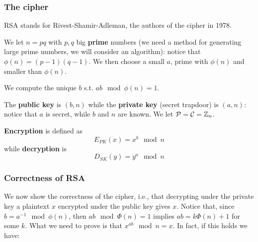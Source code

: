 
\subsubsection{The cipher}
RSA stands for Rivest-Shamir-Adleman, the authors of the cipher in 1978. 

We let $n = pq$ with $p,q$ big \textbf{prime} numbers (we need a method for generating large prime numbers, we will consider an algorithm): notice that $\phi(n) = (p-1)(q-1)$. We then choose a small $a$, prime with $\phi(n)$ and smaller than $\phi(n)$. 


We compute the unique $b$ s.t. $ab \mod \phi(n) = 1$.


The \textbf{public key} is $(b,n)$ while the \textbf{private key} (secret trapdoor) is $(a,n)$: notice that $a$ is secret, while $b$ and $n$ are known. We let ${\cal P}={\cal C} = \mathbb{Z}_n$. 

\textbf{Encryption} is defined as $$E_{PK}(x) = x^{b} \mod n$$ while \textbf{decryption} is $$D_{SK}(y) = y^{a} \mod n$$


\subsubsection{Correctness of RSA}

We now show the correctness of the cipher, i.e., that decrypting under the private key a plaintext $x$ encrypted under the public key gives $x$. Notice that, since $b = a^{-1} \mod \phi(n)$, then $ab \mod \Phi(n) = 1$ implies $ab = k\Phi(n) +1$ for some $k$. What we need to prove is that $x^{ab} \mod n = x$. In fact, if this holds we have:

